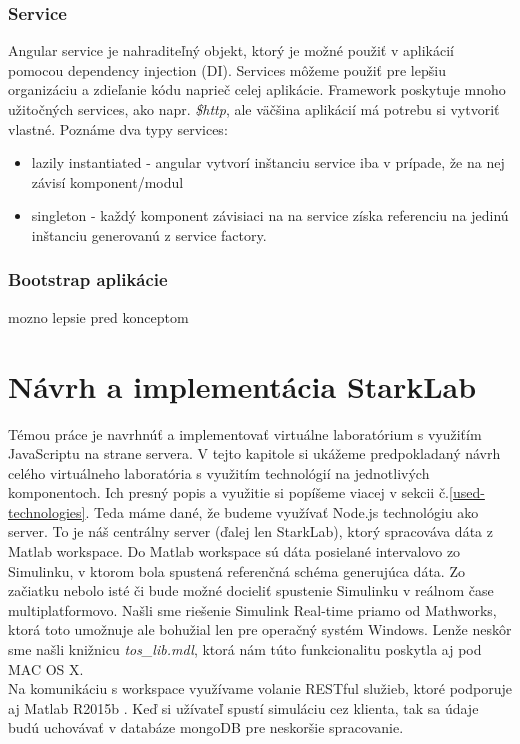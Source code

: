 \subsubsection{Service}
Angular service je nahraditeľný objekt, ktorý je možné použiť v aplikácií pomocou dependency injection (DI). Services môžeme použiť pre lepšiu organizáciu a zdieľanie kódu naprieč celej aplikácie. Framework poskytuje mnoho užitočných services, ako napr. \textit{\$http}, ale väčšina aplikácií má potrebu si vytvoriť vlastné.\cite{angular-docs}
Poznáme dva typy services:
\begin{itemize}
\item lazily instantiated - angular vytvorí inštanciu service iba v prípade, že na nej závisí komponent/modul
\item singleton - každý komponent závisiaci na na service získa referenciu na jedinú inštanciu generovanú z service factory.
\end{itemize}

\subsubsection{Bootstrap aplikácie}
mozno lepsie pred konceptom

\section{Návrh a implementácia StarkLab}
\indent Témou práce je navrhnúť a implementovať virtuálne laboratórium s využiťím JavaScriptu na strane servera. V tejto kapitole si ukážeme predpokladaný návrh celého virtuálneho laboratória s využitím technológií na jednotlivých komponentoch. Ich presný popis a využitie si popíšeme viacej v sekcii č.\ref{used-technologies}. Teda máme dané, že budeme využívať Node.js technológiu ako server. To je náš centrálny server (ďalej len StarkLab), ktorý spracováva dáta z Matlab workspace. Do Matlab workspace sú dáta posielané intervalovo zo Simulinku, v ktorom bola spustená referenčná schéma generujúca dáta. Zo začiatku nebolo isté či bude možné docieliť spustenie Simulinku v reálnom čase multiplatformovo. Našli sme riešenie Simulink Real-time priamo od Mathworks, ktorá toto umožnuje ale bohužial len pre operačný systém Windows. Lenže neskôr sme našli knižnicu \textit{tos\_lib.mdl}, ktorá nám túto funkcionalitu poskytla aj pod MAC OS X.\\
Na komunikáciu s workspace využívame volanie RESTful služieb, ktoré podporuje aj Matlab R2015b \cite{matlab-restful}. Keď si užívateľ spustí simuláciu cez klienta, tak sa údaje budú uchovávať v databáze mongoDB pre neskoršie spracovanie.

